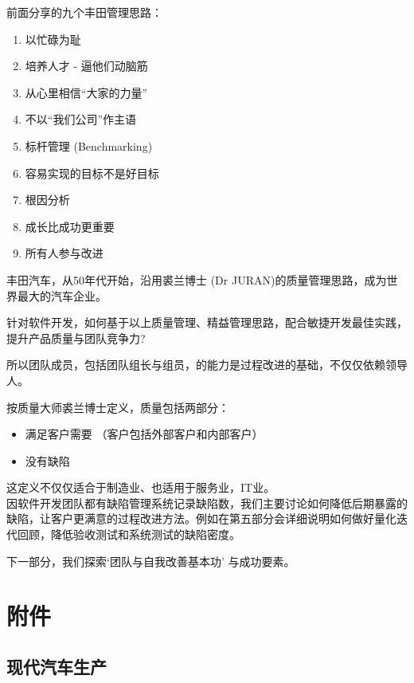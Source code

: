 前面分享的九个丰田管理思路：

\begin{enumerate}
\tightlist
\item
  以忙碌为耻
\item
  培养人才 - 逼他们动脑筋
\item
  从心里相信``大家的力量''
\item
  不以``我们公司''作主语
\item
  标杆管理 (Benchmarking)
\item
  容易实现的目标不是好目标
\item
  根因分析
\item
  成长比成功更重要
\item
  所有人参与改进
\end{enumerate}

丰田汽车，从50年代开始，沿用裘兰博士 (Dr
JURAN)的质量管理思路，成为世界最大的汽车企业。

针对软件开发，如何基于以上质量管理、精益管理思路，配合敏捷开发最佳实践，提升产品质量与团队竞争力?

所以团队成员，包括团队组长与组员，的能力是过程改进的基础，不仅仅依赖领导人。

按质量大师裘兰博士定义，质量包括两部分：

\begin{itemize}
\tightlist
\item
  满足客户需要 （客户包括外部客户和内部客户）
\item
  没有缺陷\\
\end{itemize}

这定义不仅仅适合于制造业、也适用于服务业，IT业。\\
因软件开发团队都有缺陷管理系统记录缺陷数，我们主要讨论如何降低后期暴露的缺陷，让客户更满意的过程改进方法。例如在第五部分会详细说明如何做好量化迭代回顾，降低验收测试和系统测试的缺陷密度。

下一部分，我们探索`团队与自我改善基本功' 与成功要素。

\hypertarget{ux9644ux4ef6}{%
\section{附件}\label{ux9644ux4ef6}}

\hypertarget{ux73b0ux4ee3ux6c7dux8f66ux751fux4ea7}{%
\subsection{现代汽车生产}\label{ux73b0ux4ee3ux6c7dux8f66ux751fux4ea7}}


